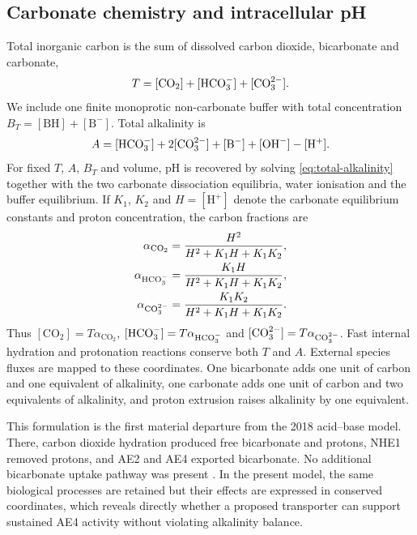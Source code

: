 \subsection{Carbonate chemistry and intracellular pH}
\label{sec:acid-base}

Total inorganic carbon is the sum of dissolved carbon dioxide, bicarbonate and carbonate,
\begin{equation*}
    T=[\mathrm{CO}_2]+[\mathrm{HCO}_{3}^{-}]+[\mathrm{CO}_{3}^{2-}].
\end{equation*}
We include one finite monoprotic non-carbonate buffer with total concentration $B_T=[\mathrm{BH}]+[\mathrm{B}^{-}]$. Total alkalinity is
\begin{equation}
    A=[\mathrm{HCO}_{3}^{-}]+2[\mathrm{CO}_{3}^{2-}]+[\mathrm{B}^{-}]+[\mathrm{OH}^{-}]-[\mathrm{H}^{+}].
    \label{eq:total-alkalinity}
\end{equation}
For fixed $T$, $A$, $B_T$ and volume, pH is recovered by solving \cref{eq:total-alkalinity} together with the two carbonate dissociation equilibria, water ionisation and the buffer equilibrium. If $K_1$, $K_2$ and $H=[\mathrm H^+]$ denote the carbonate equilibrium constants and proton concentration, the carbon fractions are
\begin{align*}
    \alpha_{\mathrm{CO}_2}&=\frac{H^2}{H^2+K_1H+K_1K_2},\\
    \alpha_{\mathrm{HCO}_{3}^{-}}&=\frac{K_1H}{H^2+K_1H+K_1K_2},\\
    \alpha_{\mathrm{CO}_{3}^{2-}}&=\frac{K_1K_2}{H^2+K_1H+K_1K_2}.
\end{align*}
Thus $[\mathrm{CO}_2]=T\alpha_{\mathrm{CO}_2}$, $[\mathrm{HCO}_{3}^{-}]=T\alpha_{\mathrm{HCO}_{3}^{-}}$ and $[\mathrm{CO}_{3}^{2-}]=T\alpha_{\mathrm{CO}_{3}^{2-}}$. Fast internal hydration and protonation reactions conserve both $T$ and $A$. External species fluxes are mapped to these coordinates. One bicarbonate adds one unit of carbon and one equivalent of alkalinity, one carbonate adds one unit of carbon and two equivalents of alkalinity, and proton extrusion raises alkalinity by one equivalent.

This formulation is the first material departure from the 2018 acid--base model. There, carbon dioxide hydration produced free bicarbonate and protons, NHE1 removed protons, and AE2 and AE4 exported bicarbonate. No additional bicarbonate uptake pathway was present \citep{VeraSiguenza2018}. In the present model, the same biological processes are retained but their effects are expressed in conserved coordinates, which reveals directly whether a proposed transporter can support sustained AE4 activity without violating alkalinity balance.

